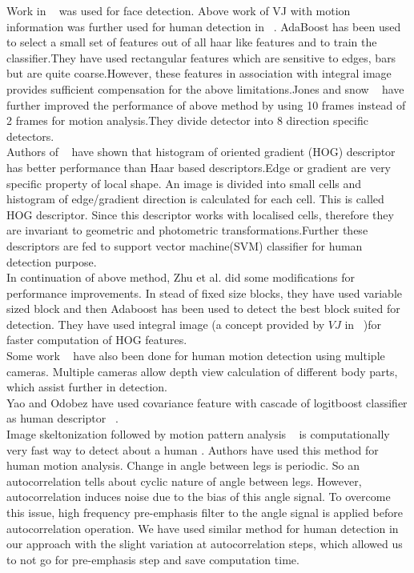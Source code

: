 Work in ~\cite{17} was used for face detection.  Above work of VJ with
motion information was further used for human detection in ~\cite{16}.
AdaBoost has been used to select a small set of features out of all haar
like features and to train the classifier.They have used rectangular
features which are sensitive to edges, bars but are quite
coarse.However, these features in association with integral image
provides sufficient compensation for the above limitations.Jones and
snow ~\cite{26} have further improved the performance of above method by
using 10 frames instead of 2 frames for motion analysis.They divide
detector into 8 direction specific detectors.\\

Authors of ~\cite{20, 21} have shown that histogram of oriented gradient
(HOG) descriptor has better performance than Haar based descriptors.Edge
or gradient are very specific property of local shape. An image is
divided into small cells and histogram of edge/gradient direction is
calculated for each cell. This is called HOG descriptor. Since this
descriptor works with localised cells, therefore they are invariant to
geometric and photometric transformations.Further these descriptors are
fed to support vector machine(SVM) classifier for human detection
purpose.\\

In continuation of above method, Zhu et al. did some modifications for
performance improvements. In stead of fixed size blocks, they have used
variable sized block and then Adaboost has been used to detect the best
block suited for detection. They have used integral image (a concept
provided by $VJ$ in ~\cite{17})for faster computation of HOG features.\\

Some work ~\cite{30} have also been done for human motion detection
using multiple cameras. Multiple cameras allow depth view calculation of
different body parts, which assist further in detection.\\

Yao and Odobez have used covariance feature with cascade of logitboost
classifier as human descriptor ~\cite{19}.\\

Image skeltonization followed by motion pattern analysis ~\cite{32, 22,
31} is computationally very fast way to detect about a human . Authors
have used this method for human motion analysis. Change in angle between
legs is periodic. So an autocorrelation tells about cyclic nature of
angle between legs.  However, autocorrelation induces noise due to the
bias of this angle signal.  To overcome this issue, high frequency
pre-emphasis filter to the angle signal is applied before
autocorrelation operation. We have used similar method for human
detection in our approach with the slight variation at autocorrelation
steps, which allowed us to not go for pre-emphasis step and save
computation time.\\

